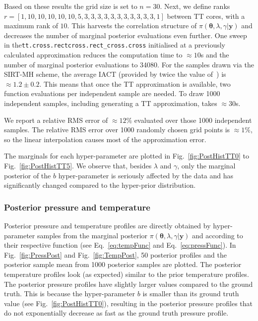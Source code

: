 Based on these results the grid size is set to $n = 30$.
Next, we define ranks $r =[ 1,  10,  10, 10, 10, 10, 5, 3, 3, 3, 3, 3, 3 , 3, 3, 3, 3, 3, 1]$ between TT cores, with a maximum rank of $10$.
This harvests the correlation structure of $\pi(\bm{\theta},\lambda,\gamma  | \bm{y})$ and decreases the number of marginal posterior evaluations even further.
One sweep in the\linebreak \texttt{tt.cross.rectcross.rect\_cross.cross} initialised at a previously calculated approximation reduces the computation time to $\approx 10$s and the number of marginal posterior evaluations to 34080.
For the samples drawn via the SIRT-MH scheme, the average IACT (provided by twice the value of~\cite{wolff2004monte, drikHesse}) is $\approx 1.2 \pm 0.2$.
This means that once the TT approximation is available, two function evaluations per independent sample are needed.
To draw 1000 independent samples, including generating a TT approximation, takes $\approx30$s.

We report a relative RMS error of $\approx 12 \%$ evaluated over those 1000 independent samples.
The relative RMS error over 1000 randomly chosen grid points is $\approx 1\%$, so the linear interpolation causes most of the approximation error.

The marginals for each hyper-parameter are plotted in Fig.~\ref{fig:PostHistTT0} to Fig.~\ref{fig:PostHistTT5}.
We observe that, besides $\lambda$ and $\gamma$, only the marginal posterior of the $b$ hyper-parameter is seriously affected by the data and has significantly changed compared to the hyper-prior distribution.
\clearpage

\subsubsection{Posterior pressure and temperature}
Posterior pressure and temperature profiles are directly obtained by hyper-parameter samples from the marginal posterior $\pi(\bm{\theta},\lambda,\gamma  | \bm{y})$ and according to their respective function (see Eq.~\ref{eq:tempFunc} and Eq.~\ref{eq:pressFunc}).
In Fig.~\ref{fig:PressPost} and Fig.~\ref{fig:TempPost}, 50 posterior profiles and the posterior sample mean from 1000
posterior samples are plotted.
The posterior temperature profiles look (as expected) similar to the prior temperature profiles.
The posterior pressure profiles have slightly larger values compared to the ground truth.
This is because the hyper-parameter $b$ is smaller than its ground truth value (see Fig.~\ref{fig:PostHistTT0}), resulting in the posterior pressure profiles that do not exponentially decrease as fast as the ground truth pressure profile.

